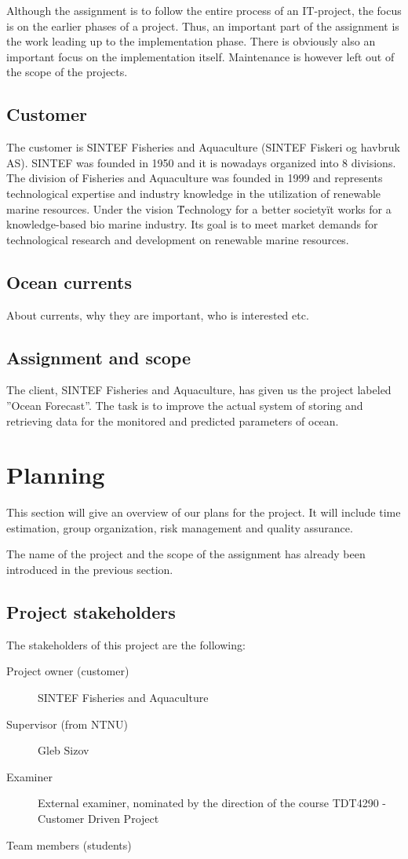 \documentclass[11pt,a4paper,titlepage,oneside]{report}
\begin{document}
Although the assignment is to follow the entire process of an IT-project, the focus is on the earlier phases of a project. Thus, an important part of the assignment is the work leading up to the implementation phase. There is obviously also an important focus on the implementation itself. Maintenance is however left out of the scope of the projects.

\section{Customer}
The customer is SINTEF Fisheries and Aquaculture (SINTEF Fiskeri og havbruk AS). 
SINTEF was founded in 1950 and it is nowadays organized into 8 divisions. The division of Fisheries and Aquaculture was founded in 1999 and represents technological expertise and industry knowledge in the utilization of renewable marine resources. Under the vision \"Technology for a better society\" it works for a knowledge-based bio marine industry. Its goal is to meet market demands for technological research and development on renewable marine resources.

\section{Ocean currents}
About currents, why they are important, who is interested etc.

\section{Assignment and scope}
The client, SINTEF Fisheries and Aquaculture, has given us the project labeled ”Ocean Forecast”. The task is to improve the actual system of storing and retrieving data for the monitored and predicted parameters of ocean.

\chapter{Planning}
This section will give an overview of our plans for the project. It will include time estimation, group organization, risk management and quality assurance.

The name of the project and the scope of the assignment has already been introduced in the previous section.
\section{Project stakeholders}
The stakeholders of this project are the following:
\begin{description}
\item[Project owner (customer)] SINTEF Fisheries and Aquaculture
\item[Supervisor (from NTNU)] Gleb Sizov
\item[Examiner] External examiner, nominated by the direction of the course TDT4290 - Customer Driven Project
\item[Team members (students)] 
\end{description}
\end{document}
